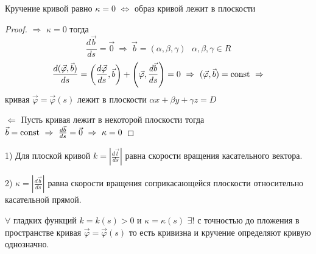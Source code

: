 \begin{theorem}
  Кручение кривой равно $\kappa = 0$ $\Leftrightarrow$ образ кривой лежит в
  плоскости
\end{theorem}

\begin{proof}
  $\Rightarrow$ $\kappa = 0$ тогда
  $$
  \frac{d\vec b}{ds} = \vec 0 ~ \Rightarrow ~ \vec b = (\alpha, \beta, \gamma)
  ~~~ \alpha, \beta, \gamma \in R
  $$
  $$
  \frac{d(\vec \varphi, \vec b)}{ds} = \left(\frac{d \vec \varphi}{ds},
  \vec b \right) + \left( \vec \varphi, \frac{d\vec b}{ds} \right) = 0 ~
  \Rightarrow ~ (\vec \varphi, \vec b) = \mathrm{const} ~ \Rightarrow
  $$
  кривая $\vec \varphi = \vec \varphi (s)$ лежит в плоскости $\alpha x +
  \beta y + \gamma z = D$

  $\Leftarrow$ Пусть кривая лежит в некоторой плоскости тогда
  $\vec b = \mathrm{const} ~ \Rightarrow ~ \frac{d \vec b}{ds} = \vec 0 ~ \Rightarrow ~
  \kappa = 0$
\end{proof}

\begin{block}
  1) Для плоской кривой $k = \left|\frac{d \vec t}{ds}\right|$ равна
  скорости вращения касательного вектора.

  2) $\kappa = \left|\frac{d\vec b}{ds}\right|$ равна скорости вращения
  соприкасающейся плоскости относительно касательной прямой.
\end{block}

\begin{theorem}
  $\forall$ гладких функций $k = k(s) > 0$ и $\kappa = \kappa(s)$ $\exists!$
  с точностью до пложения в пространстве кривая
  $\vec \varphi = \vec \varphi(s)$ то есть
  кривизна и кручение определяют кривую однозначно.
\end{theorem}